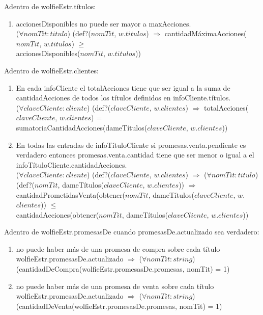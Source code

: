 \begin{Representacion}
\begin{enumerate}
 \end{enumerate}
 Adentro de wolfieEstr.títulos:
 \begin{enumerate}
 	\item accionesDisponibles no puede ser mayor a maxAcciones.\\
    ($\forall nomTit:titulo$) (def?($nomTit$, $w$.$titulos$) $\Rightarrow$ cantidadMáximaAcciones($nomTit$, $w.titulos$) $\ge$\\ accionesDisponibles($nomTit$, $w.titulos$))
 \end{enumerate}
\BlankLine
Adentro de wolfieEstr.clientes:
 \begin{enumerate}
 	\item En cada infoCliente el totalAcciones tiene que ser igual a la suma de cantidadAcciones de todos los títulos definidos en infoCliente.títulos.\\
    ($\forall claveCliente:cliente$) (def?($claveCliente$, $w$.$clientes$) $\Rightarrow$ totalAcciones($claveCliente$, $w$.$clientes$) = \\ sumatoriaCantidadAcciones(dameTítulos($claveCliente$, $w$.$clientes$))
    \item En todas las entradas de infoTítuloCliente si promesas.venta.pendiente es verdadero entonces promesas.venta.cantidad tiene que ser menor o igual a el infoTítuloCliente.cantidadAcciones.\\
($\forall claveCliente:cliente$) (def?($claveCliente$, $w$.$clientes$) $\Rightarrow$ ($\forall nomTit:titulo$)\\ (def?($nomTit$, dameTítulos($claveCliente$, $w$.$clientes$)) $\Rightarrow$\\ cantidadPrometidasVenta(obtener($nomTit$, dameTítulos($claveCliente$, $w$.$clientes$)) $\leq$\\cantidadAcciones(obtener($nomTit$, dameTítulos($claveCliente$, $w$.$clientes$))
 \end{enumerate}
 Adentro de wolfieEstr.promesasDe cuando promesasDe.actualizado sea verdadero:
 \begin{enumerate}
 	\item no puede haber más de una promesa de compra sobre cada título\\
    wolfieEstr.promesasDe.actualizado $\Rightarrow$ ($\forall nomTit:string$)\\ (cantidadDeCompra(wolfieEstr.promesasDe.promesas, nomTit) = 1)
    \item no puede haber más de una promesa de venta sobre cada título\\
    wolfieEstr.promesasDe.actualizado $\Rightarrow$ ($\forall nomTit:string$)\\(cantidadDeVenta(wolfieEstr.promesasDe.promesas, nomTit) = 1)
 \end{enumerate}


\end{Representacion}
